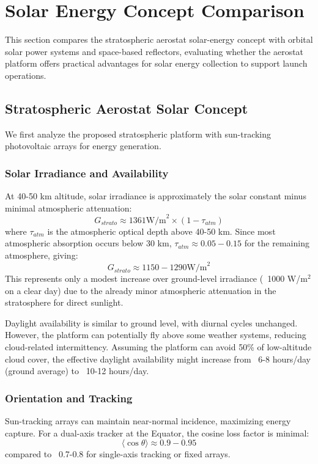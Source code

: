\section{Solar Energy Concept Comparison}
\label{sec:solar}

This section compares the stratospheric aerostat solar-energy concept with orbital solar power systems and space-based reflectors, evaluating whether the aerostat platform offers practical advantages for solar energy collection to support launch operations.

\subsection{Stratospheric Aerostat Solar Concept}
We first analyze the proposed stratospheric platform with sun-tracking photovoltaic arrays for energy generation.

\subsubsection{Solar Irradiance and Availability}
At 40-50 km altitude, solar irradiance is approximately the solar constant minus minimal atmospheric attenuation:
\begin{equation}
G_{strato} \approx 1361  \text{W/m}^2 \times (1 - \tau_{atm})
\end{equation}
where \(\tau_{atm}\) is the atmospheric optical depth above 40-50 km. Since most atmospheric absorption occurs below 30 km, \(\tau_{atm} \approx 0.05-0.15\) for the remaining atmosphere, giving:
\begin{equation}
G_{strato} \approx 1150-1290  \text{W/m}^2
\end{equation}
This represents only a modest increase over ground-level irradiance (~1000 W/m\(^2\) on a clear day) due to the already minor atmospheric attenuation in the stratosphere for direct sunlight.

Daylight availability is similar to ground level, with diurnal cycles unchanged. However, the platform can potentially fly above some weather systems, reducing cloud-related intermittency. Assuming the platform can avoid 50\% of low-altitude cloud cover, the effective daylight availability might increase from ~6-8 hours/day (ground average) to ~10-12 hours/day.

\subsubsection{Orientation and Tracking}
Sun-tracking arrays can maintain near-normal incidence, maximizing energy capture. For a dual-axis tracker at the Equator, the cosine loss factor is minimal:
\begin{equation}
\langle \cos\theta \rangle \approx 0.9-0.95
\end{equation}
compared to ~0.7-0.8 for single-axis tracking or fixed arrays.


